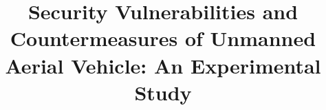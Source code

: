 \documentclass[conference]{IEEEtran}
\begin{document}
%
\title{Security Vulnerabilities and Countermeasures of Unmanned Aerial Vehicle: An Experimental Study}




% 
\end{document}
